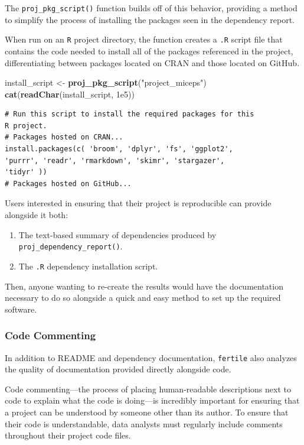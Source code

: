 \documentclass[12pt,twoside]{reedthesis}
\newenvironment{Shaded}{\begin{snugshade}}{\end{snugshade}}
\newcommand{\FloatTok}[1]{\textcolor[rgb]{0.00,0.00,0.81}{#1}}
\newcommand{\KeywordTok}[1]{\textcolor[rgb]{0.13,0.29,0.53}{\textbf{#1}}}
\newcommand{\NormalTok}[1]{#1}
\newcommand{\StringTok}[1]{\textcolor[rgb]{0.31,0.60,0.02}{#1}}
\providecommand{\tightlist}{%
  \setlength{\itemsep}{0pt}\setlength{\parskip}{0pt}}
\begin{document}
The \texttt{proj\_pkg\_script()} function builds off of this behavior, providing a method to simplify the process of installing the packages seen in the dependency report.

When run on an \texttt{R} project directory, the function creates a \texttt{.R} script file that contains the code needed to install all of the packages referenced in the project, differentiating between packages located on CRAN and those located on GitHub.
\begin{Shaded}
\begin{Highlighting}[]
\NormalTok{install_script <-}\StringTok{ }\KeywordTok{proj_pkg_script}\NormalTok{(}\StringTok{"project_miceps"}\NormalTok{)}
\KeywordTok{cat}\NormalTok{(}\KeywordTok{readChar}\NormalTok{(install_script, }\FloatTok{1e5}\NormalTok{))}
\end{Highlighting}
\end{Shaded}
\begin{verbatim}
# Run this script to install the required packages for this
R project.
# Packages hosted on CRAN...
install.packages(c( 'broom', 'dplyr', 'fs', 'ggplot2',
'purrr', 'readr', 'rmarkdown', 'skimr', 'stargazer',
'tidyr' ))
# Packages hosted on GitHub...
\end{verbatim}
Users interested in ensuring that their project is reproducible can provide alongside it both:
\begin{enumerate}
\def\labelenumi{\arabic{enumi}.}
\tightlist
\item
  The text-based summary of dependencies produced by \texttt{proj\_dependency\_report()}.
\item
  The \texttt{.R} dependency installation script.
\end{enumerate}
Then, anyone wanting to re-create the results would have the documentation necessary to do so alongside a quick and easy method to set up the required software.

\hypertarget{code-commenting}{%
\subsubsection{Code Commenting}\label{code-commenting}}

In addition to README and dependency documentation, \texttt{fertile} also analyzes the quality of documentation provided directly alongside code.

Code commenting---the process of placing human-readable descriptions next to code to explain what the code is doing---is incredibly important for ensuring that a project can be understood by someone other than its author. To ensure that their code is understandable, data analysts must regularly include comments throughout their project code files.
\end{document}
